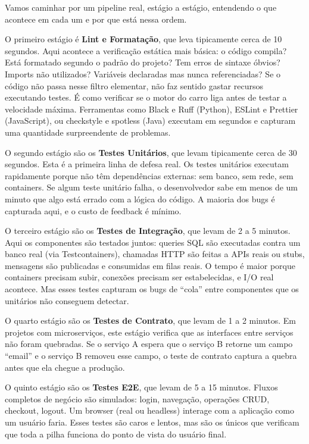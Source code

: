 Vamos caminhar por um pipeline real, estágio a estágio, entendendo o que
acontece em cada um e por que está nessa ordem.

O primeiro estágio é \textbf{Lint e Formatação}, que leva tipicamente cerca de
10 segundos. Aqui acontece a verificação estática mais básica: o código compila?
Está formatado segundo o padrão do projeto? Tem erros de sintaxe óbvios? Imports
não utilizados? Variáveis declaradas mas nunca referenciadas? Se o código não
passa nesse filtro elementar, não faz sentido gastar recursos executando testes.
É como verificar se o motor do carro liga antes de testar a velocidade máxima.
Ferramentas como Black e Ruff (Python), ESLint e Prettier (JavaScript), ou
checkstyle e spotless (Java) executam em segundos e capturam uma quantidade
surpreendente de problemas.

O segundo estágio são os \textbf{Testes Unitários}, que levam tipicamente cerca
de 30 segundos. Esta é a primeira linha de defesa real. Os testes unitários
executam rapidamente porque não têm dependências externas: sem banco, sem
rede, sem containers. Se algum teste unitário falha, o desenvolvedor sabe em
menos de um minuto que algo está errado com a lógica do código. A maioria dos
bugs é capturada aqui, e o custo de feedback é mínimo.

O terceiro estágio são os \textbf{Testes de Integração}, que levam de 2 a 5
minutos. Aqui os componentes são testados juntos: queries SQL são executadas
contra um banco real (via Testcontainers), chamadas HTTP são feitas a APIs
reais ou stubs, mensagens são publicadas e consumidas em filas reais. O tempo é
maior porque containers precisam subir, conexões precisam ser estabelecidas, e
I/O real acontece. Mas esses testes capturam os bugs de ``cola'' entre
componentes que os unitários não conseguem detectar.

O quarto estágio são os \textbf{Testes de Contrato}, que levam de 1 a 2
minutos. Em projetos com microserviços, este estágio verifica que as interfaces
entre serviços não foram quebradas. Se o serviço A espera que o serviço B
retorne um campo ``email'' e o serviço B removeu esse campo, o teste de contrato
captura a quebra antes que ela chegue a produção.

O quinto estágio são os \textbf{Testes E2E}, que levam de 5 a 15 minutos.
Fluxos completos de negócio são simulados: login, navegação, operações CRUD,
checkout, logout. Um browser (real ou headless) interage com a aplicação como
um usuário faria. Esses testes são caros e lentos, mas são os únicos que
verificam que toda a pilha funciona do ponto de vista do usuário final.

